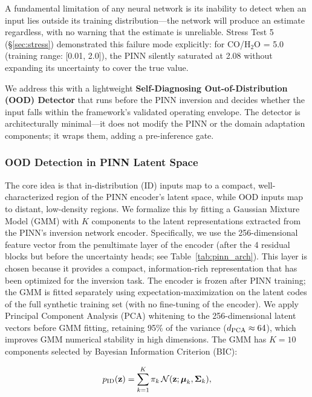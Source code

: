 \documentclass[preprint2]{aastex631}
\begin{document}
A fundamental limitation of any neural network is its inability to detect when an input lies outside its training distribution---the network will produce an estimate regardless, with no warning that the estimate is unreliable. Stress Test 5 (\S\ref{sec:stress}) demonstrated this failure mode explicitly: for CO/H$_2$O = 5.0 (training range: [0.01, 2.0]), the PINN silently saturated at 2.08 without expanding its uncertainty to cover the true value.

We address this with a lightweight \textbf{Self-Diagnosing Out-of-Distribution (OOD) Detector} that runs before the PINN inversion and decides whether the input falls within the framework's validated operating envelope. The detector is architecturally minimal---it does not modify the PINN or the domain adaptation components; it wraps them, adding a pre-inference gate.

\subsubsection{OOD Detection in PINN Latent Space}

The core idea is that in-distribution (ID) inputs map to a compact, well-characterized region of the PINN encoder's latent space, while OOD inputs map to distant, low-density regions. We formalize this by fitting a Gaussian Mixture Model (GMM) with $K$ components to the latent representations extracted from the PINN's inversion network encoder. Specifically, we use the 256-dimensional feature vector from the penultimate layer of the encoder (after the 4 residual blocks but before the uncertainty heads; see Table~\ref{tab:pinn_arch}). This layer is chosen because it provides a compact, information-rich representation that has been optimized for the inversion task. The encoder is frozen after PINN training; the GMM is fitted separately using expectation-maximization on the latent codes of the full synthetic training set (with no fine-tuning of the encoder). We apply Principal Component Analysis (PCA) whitening to the 256-dimensional latent vectors before GMM fitting, retaining 95\% of the variance ($d_{\rm PCA} \approx 64$), which improves GMM numerical stability in high dimensions. The GMM has $K=10$ components selected by Bayesian Information Criterion (BIC):

\begin{equation}\label{eq:gmm}
p_{\rm ID}(\mathbf{z}) = \sum_{k=1}^{K} \pi_k \, \mathcal{N}(\mathbf{z}; \boldsymbol{\mu}_k, \boldsymbol{\Sigma}_k),
\end{equation}
\end{document}
